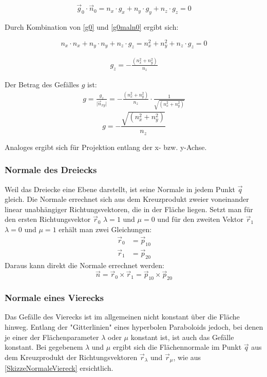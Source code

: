 \begin{equation}
	\label{g0maln0}
	\vec{g}_{0} \cdot \vec{n}_{0} =  n_{x} \cdot g_{x} +  n_{y} \cdot g_{y} + n_{z} \cdot  g_{z} = 0
\end{equation}

Durch Kombination von \cref{g0} und \cref{g0maln0} ergibt sich:

\begin{equation}
	\nonumber
	n_{x} \cdot n_{x} +  n_{y} \cdot n_{y} + n_{z} \cdot  g_{z} = n_{x}^{2} + n_{y}^{2} + n_{z} \cdot g_{z} = 0
\end{equation}

\begin{align}
	\boxed{ g_{z} = - \frac{(n_{x}^{2} + n_{y}^{2} )}{n_{z}} }
\end{align}

Der Betrag des Gefälles $g$ ist:
\begin{align*}
	g=\frac{ g_{z}}{ \lvert \vec{n}_{xy} \rvert }
	=- \frac{(n_{x}^{2} + n_{y}^{2})}{n_{z}} \cdot \frac{1}{\sqrt{(n_{x}^{2} + n_{y}^{2})}}
\end{align*}
\begin{equation}
	\boxed{g= - \frac{\sqrt{(n_{x}^{2} + n_{y}^{2})}}{n_{z}} }
\end{equation}

Analoges ergibt sich für Projektion entlang der x- bzw. y-Achse.

\subsubsection{Normale des Dreiecks}
Weil das Dreiecke eine Ebene darstellt, ist seine Normale in jedem Punkt $\vec{q}$ gleich. Die Normale errechnet sich aus dem Kreuzprodukt zweier voneinander linear unabhängiger Richtungsvektoren, die in der Fläche liegen. Setzt man für den ersten Richtungsvektor $\vec{r}_{0}$ $\lambda = 1$ und $\mu = 0$ und für den zweiten Vektor $\vec{r}_{1}$ $\lambda = 0$ und $\mu = 1$ erhält man zwei Gleichungen:
\begin{align*}
	\vec{r}_{0} &=  \vec{p}_{10} \\
	\vec{r}_{1} &=  \vec{p}_{20}
\end{align*}
Daraus kann direkt die Normale errechnet werden:
\begin{equation}
	\boxed{
		\vec{n} = \vec{r}_{0} \times \vec{r}_{1} = \vec{p}_{10} \times \vec{p}_{20}
	}
\end{equation}

\subsubsection{Normale eines Vierecks}
Das Gefälle des Vierecks ist im allgemeinen nicht konstant über die Fläche hinweg. Entlang der "Gitterlinien" eines hyperbolen Paraboloids jedoch, bei denen je einer der Flächenparameter $\lambda$ oder $\mu$ konstant ist, ist auch das Gefälle konstant. Bei gegebenem $\lambda$ und $\mu$ ergibt sich die Flächennormale im Punkt $\vec{q}$ aus dem Kreuzprodukt der Richtungsvektoren $\vec{r}_{\lambda}$ und $\vec{r}_{\mu}$, wie aus \cref{SkizzeNormaleViereck} ersichtlich.

